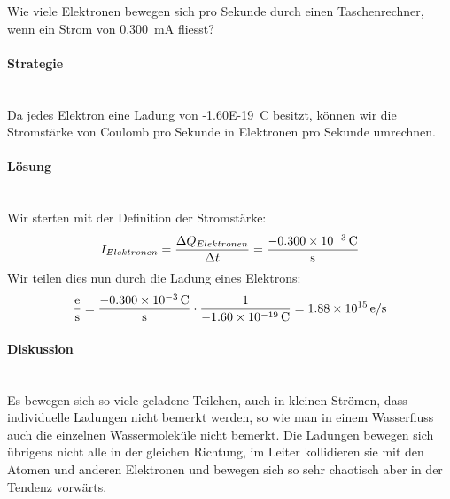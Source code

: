 \documentclass[11pt,twoside=false,open=any]{scrbook}
\begin{document}
\begin{tcolorbox}[breakable,colback=white, title=Beispiel: Anzahl Elektronen die sich durch einen Taschenrechner bewegen]
Wie viele Elektronen bewegen sich pro Sekunde durch einen Taschenrechner, wenn ein Strom von \SI{0.300}{\milli \ampere} fliesst?
\paragraph{Strategie}\mbox{}\\
    Da jedes Elektron eine Ladung von \SI{-1.60E-19}{\coulomb} besitzt, können wir die Stromstärke von Coulomb pro Sekunde in Elektronen pro Sekunde umrechnen.
\paragraph{Lösung}\mbox{}\\
    Wir sterten mit der Definition der Stromstärke:
    \[ I_{Elektronen} = \frac{\Delta Q_{Elektronen}}{\Delta t} = \frac{\SI{-0.300E-3}{C}}{\si{s}}  \]
    Wir teilen dies nun durch die Ladung eines Elektrons:
    \[ \frac{\si{e}}{\si{s}} = \frac{\SI{-0.300E-3}{\coulomb}}{\si{s}} \cdot \frac{1}{\SI{-1.60E-19}{\coulomb}}  = \SI{1.88E15}{e \per \second}\]
\paragraph{Diskussion}\mbox{}\\
    Es bewegen sich so viele geladene Teilchen, auch in kleinen Strömen, dass individuelle Ladungen nicht bemerkt werden, so wie man in einem Wasserfluss auch die einzelnen Wassermoleküle nicht bemerkt. Die Ladungen bewegen sich übrigens nicht alle in der gleichen Richtung, im Leiter kollidieren sie mit den Atomen und anderen Elektronen und bewegen sich so sehr chaotisch aber in der Tendenz vorwärts.

\end{tcolorbox}
\end{document}
